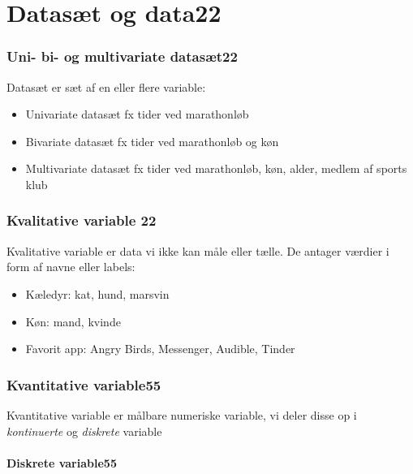 \documentclass[]{book}
\providecommand{\tightlist}{%
  \setlength{\itemsep}{0pt}\setlength{\parskip}{0pt}}
\theoremstyle{definition}
\theoremstyle{definition}
\theoremstyle{definition}
\theoremstyle{remark}
\begin{document}
\hypertarget{datast-og-data22}{%
\chapter{Datasæt og data22}\label{datast-og-data22}}

\hypertarget{uni--bi--og-multivariate-datast22}{%
\subsection{Uni- bi- og multivariate
datasæt22}\label{uni--bi--og-multivariate-datast22}}

Datasæt er sæt af en eller flere variable:

\begin{itemize}
\tightlist
\item
  Univariate datasæt fx tider ved marathonløb\\
\item
  Bivariate datasæt fx tider ved marathonløb og køn
\item
  Multivariate datasæt fx tider ved marathonløb, køn, alder, medlem af
  sports klub
\end{itemize}

\hypertarget{kvalitative-variable-22}{%
\subsection{Kvalitative variable 22}\label{kvalitative-variable-22}}

Kvalitative variable er data vi ikke kan måle eller tælle. De antager
værdier i form af navne eller labels:

\begin{itemize}
\tightlist
\item
  Kæledyr: kat, hund, marsvin
\item
  Køn: mand, kvinde
\item
  Favorit app: Angry Birds, Messenger, Audible, Tinder
\end{itemize}

\hypertarget{kvantitative-variable55}{%
\subsection{Kvantitative variable55}\label{kvantitative-variable55}}

Kvantitative variable er målbare numeriske variable, vi deler disse op i
\emph{kontinuerte} og \emph{diskrete} variable

\hypertarget{diskrete-variable55}{%
\subsubsection{Diskrete variable55}\label{diskrete-variable55}}
\end{document}
